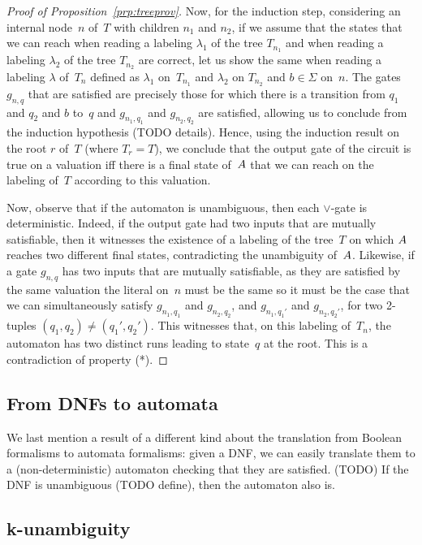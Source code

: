 \begin{proof}[Proof of Proposition~\ref{prp:treeprov}]
  Now, for the induction step, considering an internal node~$n$ of~$T$ with
  children $n_1$ and $n_2$, if we assume that the
  states that we can reach when reading a labeling $\lambda_1$ of the tree
  $T_{n_1}$ and when reading a labeling $\lambda_2$ of the tree $T_{n_2}$ are
  correct, let us show the same when reading a labeling $\lambda$ of~$T_n$
  defined as $\lambda_1$ on~$T_{n_1}$ and $\lambda_2$ on $T_{n_2}$ and $b \in
  \Sigma$ on~$n$. The gates $g_{n,q}$ that are satisfied are precisely those for
  which there is a transition from $q_1$ and $q_2$ and $b$ to~$q$ and
  $g_{n_1,q_1}$ and $g_{n_2,q_2}$ are satisfied, allowing us to conclude from
  the induction hypothesis (TODO details). Hence, using the induction result on
  the root $r$ of~$T$ (where $T_r = T$), we conclude that the output gate of the
  circuit is true on a valuation iff there is a final state of~$A$ that we can
  reach on the labeling of~$T$ according to this valuation.

  Now, observe that if the automaton is unambiguous, then each $\lor$-gate is
  deterministic. Indeed, if the output gate had two inputs that are mutually
  satisfiable, then it witnesses the existence of a labeling of the tree~$T$
  on which $A$ reaches two different final states, contradicting the
  unambiguity of~$A$. Likewise, if a gate $g_{n,q}$ has two inputs that are
  mutually satisfiable, as they are satisfied by the same valuation the literal
  on~$n$ must be the same so it must be the case that we can simultaneously
  satisfy $g_{n_1, q_1}$ and $g_{n_2, q_2}$, and $g_{n_1,q_1'}$ and
  $g_{n_2,q_2'}$, for two 2-tuples $(q_1,q_2) \neq (q_1',q_2')$. This witnesses
  that, on this labeling of~$T_n$, the automaton has two distinct runs leading
  to state~$q$ at the root. This is a contradiction of property (*).
\end{proof}

\subsection{From DNFs to automata}

We last mention a result of a different kind about the translation from Boolean
formalisms to automata formalisms: given a DNF, we can easily translate them to
a (non-deterministic) automaton checking that they are satisfied. (TODO) If the
DNF is unambiguous (TODO define), then the automaton also is.

\subsection{k-unambiguity}

